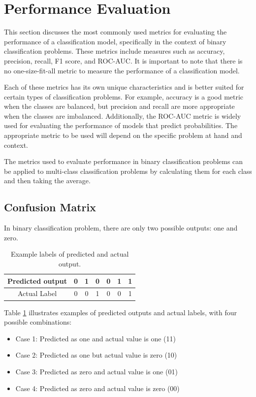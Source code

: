 \newpage
\section{Performance Evaluation}\label{sec:Clsevaluation}

This section discusses the most commonly used metrics for evaluating the performance of a classification model, specifically in the context of binary classification problems. These metrics include measures such as accuracy, precision, recall, F1 score, and ROC-AUC. It is important to note that there is no one-size-fit-all metric to measure the performance of a classification model.

Each of these metrics has its own unique characteristics and is better suited for certain types of classification problems. For example, accuracy is a good metric when the classes are balanced, but precision and recall are more appropriate when the classes are imbalanced. Additionally, the ROC-AUC metric is widely used for evaluating the performance of models that predict probabilities. The appropriate metric to be used will depend on the specific problem at hand and context.

The metrics used to evaluate performance in binary classification problems can be applied to multi-class classification problems by calculating them for each class and then taking the average.

\subsection{Confusion Matrix}
In binary classification problem, there are only two possible outputs: one and zero.
\begin{table}[!ht]
\centering
\begin{tabular}{|c|c|c|c|c|c|c| }
    \hline
    Predicted output & 0 & 1 & 0 & 0 & 1 & 1  \\
    \hline
    Actual Label & 0 & 0 & 1 & 0 & 0 & 1\\
    \hline
\end{tabular}
\caption{Example labels of predicted and actual output.}\label{tb:cmTable}
\end{table}

Table \ref{tb:cmTable} illustrates examples of predicted outputs and actual labels, with four possible combinations:
\begin{itemize}
  \item Case 1: Predicted as one and actual value is one (11)
  \item Case 2: Predicted as one but actual value is zero (10)
  \item Case 3: Predicted as zero and actual value is one  (01)
  \item Case 4: Predicted as zero and actual value is zero (00)
\end{itemize}

